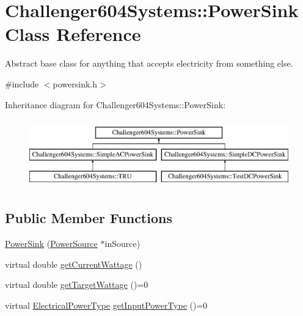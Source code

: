 \hypertarget{class_challenger604_systems_1_1_power_sink}{\section{Challenger604\-Systems\-:\-:Power\-Sink Class Reference}
\label{class_challenger604_systems_1_1_power_sink}
}


Abstract base class for anything that accepts electricity from something else.  




{\ttfamily \#include $<$powersink.\-h$>$}

Inheritance diagram for Challenger604\-Systems\-:\-:Power\-Sink\-:\begin{figure}[H]
\begin{center}
\leavevmode
\includegraphics[height=3.000000cm]{class_challenger604_systems_1_1_power_sink}
\end{center}
\end{figure}
\subsection*{Public Member Functions}
\begin{DoxyCompactItemize}
\item 
\hyperlink{class_challenger604_systems_1_1_power_sink_accbc82df84ef292c094f5b46fa5c7216}{Power\-Sink} (\hyperlink{class_challenger604_systems_1_1_power_source}{Power\-Source} $\ast$in\-Source)
\item 
virtual double \hyperlink{class_challenger604_systems_1_1_power_sink_a1940be81051bb43767530bba4d777a00}{get\-Current\-Wattage} ()
\item 
virtual double \hyperlink{class_challenger604_systems_1_1_power_sink_a0e20d9dc77b0baadf0fca20f9da5bc26}{get\-Target\-Wattage} ()=0
\item 
virtual \hyperlink{namespace_challenger604_systems_a9ad1a793d94b97514092692cb7315afd}{Electrical\-Power\-Type} \hyperlink{class_challenger604_systems_1_1_power_sink_aeb901bdc03e7c2c5cef0ccc3ff078a89}{get\-Input\-Power\-Type} ()=0
\end{DoxyCompactItemize}
